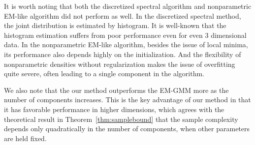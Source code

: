 \documentclass{article}
\begin{document}
It is worth noting that both the discretized spectral algorithm and nonparametric EM-like algorithm did not perform as well. In the discretized spectral method, the joint distribution is estimated by histogram. It is well-known that the histogram estimation suffers from poor performance even for even 3 dimensional data. In the nonparametric EM-like algorithm, besides the issue of local minima, its performance also depends highly on the initialization. And the flexibility of nonparametric densities without regularization makes the issue of overfitting quite severe, often leading to a single component in the algorithm.

We also note that the our method outperforms the EM-GMM more as the number of components increases.
This is the key advantage of our method in that it has favorable performance in higher dimensions, which agrees with the theoretical result in Theorem~\ref{thm:samplebound} that the sample complexity depends only quadratically in the number of components, when other parameters are held fixed.

\end{document}
